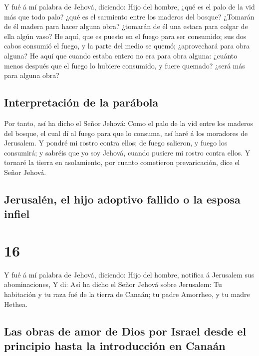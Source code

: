  Y fué á mí palabra de Jehová, diciendo: 
Hijo del hombre, ¿qué es el palo de la vid más que todo palo? ¿qué es el
sarmiento entre los maderos del bosque?  ¿Tomarán de él
madera para hacer alguna obra? ¿tomarán de él una estaca para colgar de
ella algún vaso?  He aquí, que es puesto en el fuego para
ser consumido; sus dos cabos consumió el fuego, y la parte del medio se
quemó; ¿aprovechará para obra alguna?  He aquí que cuando
estaba entero no era para obra alguna: ¿cuánto menos después que el
fuego lo hubiere consumido, y fuere quemado? ¿será más para alguna obra?

\hypertarget{interpretaciuxf3n-de-la-paruxe1bola}{%
\subsection{Interpretación de la
parábola}\label{interpretaciuxf3n-de-la-paruxe1bola}}

 Por tanto, así ha dicho el Señor Jehová: Como el palo de
la vid entre los maderos del bosque, el cual dí al fuego para que lo
consuma, así haré á los moradores de Jerusalem.  Y pondré
mi rostro contra ellos; de fuego salieron, y fuego los consumirá; y
sabréis que yo soy Jehová, cuando pusiere mi rostro contra ellos.
 Y tornaré la tierra en asolamiento, por cuanto cometieron
prevaricación, dice el Señor Jehová.

\hypertarget{jerusaluxe9n-el-hijo-adoptivo-fallido-o-la-esposa-infiel}{%
\subsection{Jerusalén, el hijo adoptivo fallido o la esposa
infiel}\label{jerusaluxe9n-el-hijo-adoptivo-fallido-o-la-esposa-infiel}}

\hypertarget{section-26-16}{%
\section{16}\label{section-26-16}}

 Y fué á mí palabra de Jehová, diciendo: 
Hijo del hombre, notifica á Jerusalem sus abominaciones, 
Y di: Así ha dicho el Señor Jehová sobre Jerusalem: Tu habitación y tu
raza fué de la tierra de Canaán; tu padre Amorrheo, y tu madre Hethea.

\hypertarget{las-obras-de-amor-de-dios-por-israel-desde-el-principio-hasta-la-introducciuxf3n-en-canauxe1n}{%
\subsection{Las obras de amor de Dios por Israel desde el principio
hasta la introducción en
Canaán}\label{las-obras-de-amor-de-dios-por-israel-desde-el-principio-hasta-la-introducciuxf3n-en-canauxe1n}}

